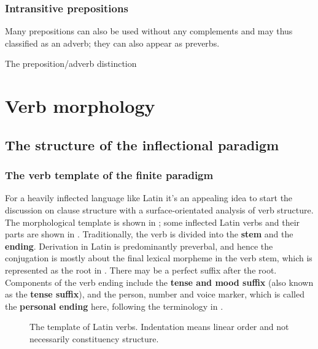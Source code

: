 \documentclass[a4paper, oneside, 12pt]{report}
\newcommand*{\citesec}[1]{\S~{#1}}
\newcommand*{\concept}[1]{\textbf{#1}}
\begin{document}
\subsection{Intransitive prepositions}

Many prepositions can also be used without any complements 
and may thus classified as an adverb; 
they can also appear as preverbs.

The preposition/adverb distinction

\chapter{Verb morphology}\label{chap:verb}

\section{The structure of the inflectional paradigm}

\subsection{The verb template of the finite paradigm}\label{sec:verb.finite.paradigm}

For a heavily inflected language like Latin
it's an appealing idea 
to start the discussion on clause structure 
with a surface-orientated analysis of verb structure.
The morphological template is shown in ; 
some inflected Latin verbs and their parts are shown in .
Traditionally, the verb is divided 
into the \concept{stem} and the \concept{ending}.
Derivation in Latin is predominantly preverbal,
and hence the conjugation is mostly about the final lexical morpheme in the verb stem,
which is represented as the root in .
There may be a perfect suffix after the root.
Components of the verb ending include 
the \concept{tense and mood suffix} (also known as the \concept{tense suffix}),
and the person, number and voice marker,
which is called the \concept{personal ending} here, 
following the terminology in \citet[\citesec{165}]{allen1903allen}.

\begin{figure}[H]
    \centering
    
    \caption{The template of Latin verbs.
    Indentation means linear order and not necessarily constituency structure.}
    \label{fig:latin-verb}
\end{figure}
\end{document}
